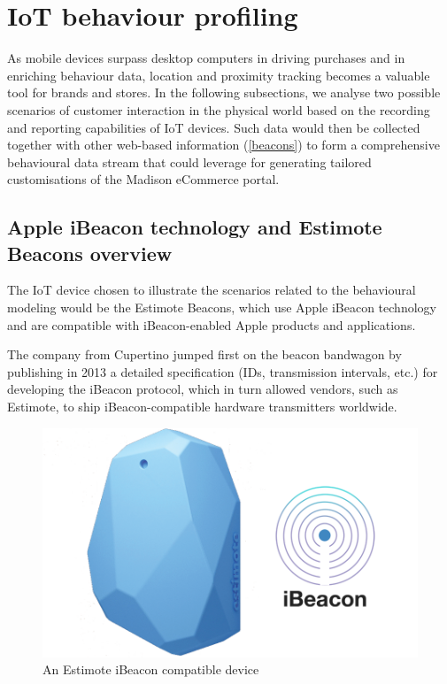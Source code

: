 \newpage
\section{IoT behaviour profiling}

As mobile devices surpass desktop computers in driving purchases and in enriching behaviour data, location and proximity tracking becomes a valuable tool for brands and stores. In the following subsections, we analyse two possible scenarios of customer interaction in the physical world based on the recording and reporting capabilities of IoT devices. Such data would then be collected together with other web-based information (\ref{beacons}) to form a comprehensive behavioural data stream that could leverage for generating tailored customisations of the Madison eCommerce portal.

\subsection{Apple iBeacon technology and Estimote Beacons overview}

The IoT device chosen to illustrate the scenarios related to the behavioural modeling would be the Estimote Beacons, which use Apple iBeacon technology and are compatible with iBeacon-enabled Apple products and applications.

The company from Cupertino jumped first on the beacon bandwagon by publishing in 2013 a detailed specification (IDs, transmission intervals, etc.) for developing the iBeacon protocol, which in turn allowed vendors, such as Estimote, to ship iBeacon-compatible hardware transmitters worldwide.

\vspace{0.5cm}
\begin{figure}[H]
  \centering
    \includegraphics[width=16cm]{images/ibeacon.png}
  \caption{An Estimote iBeacon compatible device}
  \label{fig:estimote-beacon}
\end{figure}
\vspace{0.5cm}

